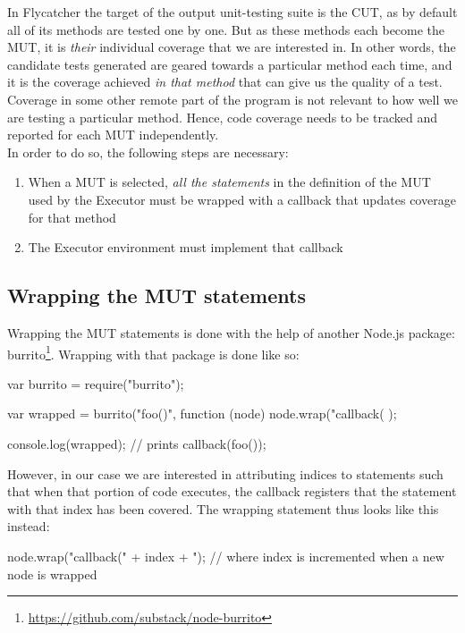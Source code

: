 In \textsf{Flycatcher} the target of the output unit-testing suite is the CUT, as by default all of its methods are tested one by one. But as these methods each become the MUT, it is \emph{their} individual coverage that we are interested in. In other words, the candidate tests generated are geared towards a particular method each time, and it is the coverage achieved \emph{in that method} that can give us the quality of a test. Coverage in some other remote part of the program is not relevant to how well we are testing a particular method. Hence, code coverage needs to be tracked and reported for each MUT independently.\\

In order to do so, the following steps are necessary:
\begin{enumerate}
   \item When a MUT is selected, \emph{all the statements} in the definition of the MUT used by the \textsf{Executor} must be wrapped with a callback that updates coverage for that method
   \item The \textsf{Executor} environment must implement that callback
\end{enumerate}

\subsection{Wrapping the MUT statements}
Wrapping the MUT statements is done with the help of another \textsf{Node.js} package: \textsf{burrito}\footnote{\url{https://github.com/substack/node-burrito}}. Wrapping with that package is done like so:

\begin{code}[caption=Wrapping with \textsf{burrito},label=burrito]
   var burrito = require("burrito");
   
   var wrapped = burrito("foo()", function (node) {
       node.wrap("callback(%
   });
   
   console.log(wrapped); // prints callback(foo());
\end{code}

However, in our case we are interested in attributing indices to statements such that when that portion of code executes, the callback registers that the statement with that index has been covered. The wrapping statement thus looks like this instead:

\begin{code}
node.wrap("callback(" + index + "); %
// where index is incremented when a new node is wrapped
\end{code}


